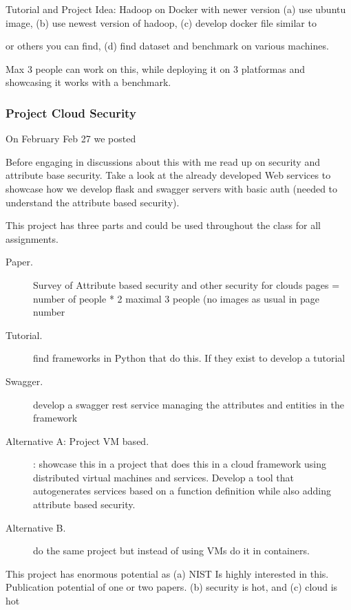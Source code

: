 Tutorial and Project Idea: Hadoop on Docker with newer version
(a) use ubuntu image, (b) use newest version of hadoop, (c) develop
docker file similar to


or others you can find, (d) find dataset and benchmark on various
machines.

Max 3 people can work on this, while deploying it on 3 platformas and
showcasing it works with a benchmark.
 

\subsubsection{Project Cloud Security}

On February Feb 27 we posted

Before engaging in discussions about this with me read
up on security and attribute base security. Take a look at the already
developed Web services to showcase how we develop flask and swagger
servers with basic auth (needed to understand the attribute based
security).
 

This project has three parts and could be used throughout the class
for all assignments.

\begin{description} 

\item[Paper.] Survey of Attribute based security and other security
  for clouds pages = number of people * 2 maximal 3 people (no images
  as usual in page number
 
\item [Tutorial.] find frameworks in Python that do this. If they
  exist to develop a tutorial
 
\item[Swagger.] develop a swagger rest service managing the attributes
  and entities in the framework
 
\item[Alternative A: Project VM based.]: showcase this in a project
  that does this in a cloud framework using distributed virtual
  machines and services. Develop a tool that autogenerates services
  based on a function definition while also adding attribute based
  security.
 
\item[Alternative B.] do the same project but instead of using VMs do
  it in containers.
 
\end{description}

This project has enormous potential as (a) NIST Is highly interested
in this. Publication potential of one or two papers. (b) security is
hot, and (c) cloud is hot
 

